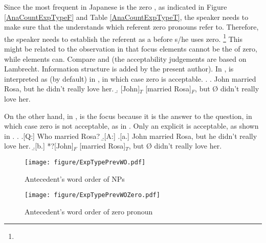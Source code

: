 \largerpage[-1]
Since the most frequent  in Japanese is the zero , as indicated in Figure \ref{AnaCountExpTypeF} and Table \ref{AnaCountExpTypeT},
the speaker needs to make sure that the  understands which referent zero pronouns refer to.
Therefore, the speaker needs to establish the referent as a 
before s/he uses zero.%
 \footnote{}
This might be related to the observation in  that
focus elements cannot be the  of zero,
while  elements can.
Compare \Next and \NNext (the acceptability judgements are based on Lambrecht. Information structure is added by the present author).
In \Next,  is interpreted as  (by default) in \Next[b],
in which case zero is acceptable.
%
\ex.\label{WO:TopicAppearClause-Initially:Ex:John}
 \a. John married Rosa, but he didn't really love her.
 \b. [John]$_{T}$ [married Rosa]$_{F}$, but {\O} didn't really love her.

On the other hand,
in \Next,
 is the focus because it is the answer to the question,
in which case zero is not acceptable, as in \Next[b].
Only an explicit  is acceptable, as shown in \Next[a].
%
\ex.\label{WO:TopicAppearClause-Initially:Ex:Rosa}
 \a.[Q:] Who married Rosa?
 \b.[A:]
   \a.[a.] John married Rosa, but he didn't really love her.
   \b.[b.] *?[John]$_{F}$ [married Rosa]$_{T}$, but {\O} didn't really love her.


\begin{figure}
	\begin{center}
	\texttt{[image: figure/ExpTypePrevWO.pdf]}
	\caption{Antecedent's word order of NPs}
	\label{ExpTypePrevWOF}
	\end{center}
\end{figure}
\begin{figure}
	\begin{center}
	\texttt{[image: figure/ExpTypePrevWOZero.pdf]}
	\caption{Antecedent's word order of zero pronoun}
	\label{ExpTypePrevWOZeroF}
	\end{center}
\end{figure}

